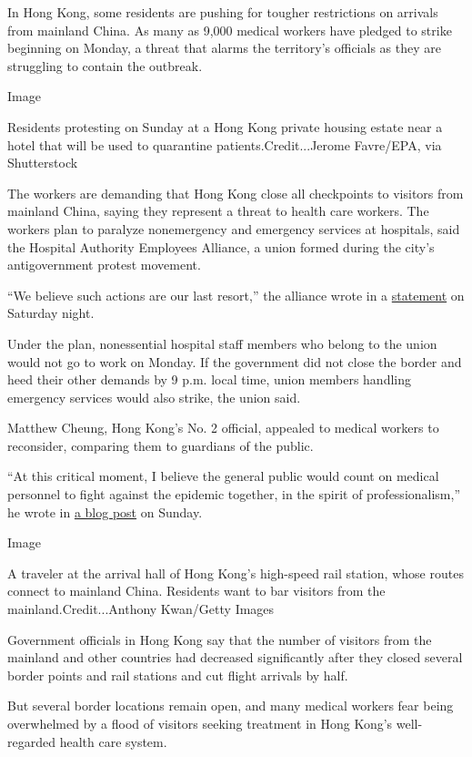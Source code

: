 In Hong Kong, some residents are pushing for tougher restrictions on
arrivals from mainland China. As many as 9,000 medical workers have
pledged to strike beginning on Monday, a threat that alarms the
territory's officials as they are struggling to contain the outbreak.

Image

Residents protesting on Sunday at a Hong Kong private housing estate
near a hotel that will be used to quarantine patients.Credit...Jerome
Favre/EPA, via Shutterstock

The workers are demanding that Hong Kong close all checkpoints to
visitors from mainland China, saying they represent a threat to health
care workers. The workers plan to paralyze nonemergency and emergency
services at hospitals, said the Hospital Authority Employees Alliance, a
union formed during the city's antigovernment protest movement.

``We believe such actions are our last resort,'' the alliance wrote in a
\href{https://telegra.ph/Healthcare-Workers-Together-We-Stand-Strike-to-Protect-Hong-Kong-02-01}{statement}
on Saturday night.

Under the plan, nonessential hospital staff members who belong to the
union would not go to work on Monday. If the government did not close
the border and heed their other demands by 9 p.m. local time, union
members handling emergency services would also strike, the union said.

Matthew Cheung, Hong Kong's No. 2 official, appealed to medical workers
to reconsider, comparing them to guardians of the public.

``At this critical moment, I believe the general public would count on
medical personnel to fight against the epidemic together, in the spirit
of professionalism,'' he wrote in
\href{https://www.cso.gov.hk/eng/blog/blog20200202.htm}{a blog post} on
Sunday.

Image

A traveler at the arrival hall of Hong Kong's high-speed rail station,
whose routes connect to mainland China. Residents want to bar visitors
from the mainland.Credit...Anthony Kwan/Getty Images

Government officials in Hong Kong say that the number of visitors from
the mainland and other countries had decreased significantly after they
closed several border points and rail stations and cut flight arrivals
by half.

But several border locations remain open, and many medical workers fear
being overwhelmed by a flood of visitors seeking treatment in Hong
Kong's well-regarded health care system.


